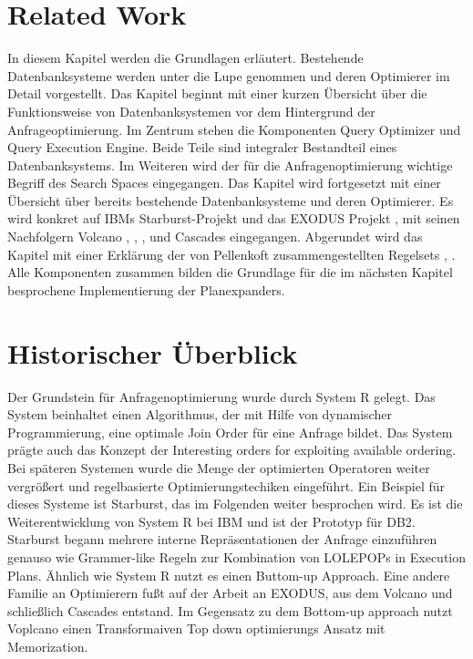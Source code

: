 \section{Related Work}

In diesem Kapitel werden die Grundlagen erläutert. Bestehende Datenbanksysteme werden unter die Lupe genommen und deren Optimierer im Detail vorgestellt. Das Kapitel beginnt mit einer kurzen Übersicht über die Funktionsweise von Datenbanksystemen vor dem Hintergrund der Anfrageoptimierung. Im Zentrum stehen die Komponenten Query Optimizer und Query Execution Engine. Beide Teile sind integraler Bestandteil eines Datenbanksystems. Im Weiteren wird der für die Anfragenoptimierung wichtige Begriff des Search Spaces eingegangen. Das Kapitel wird fortgesetzt mit einer Übersicht über bereits bestehende Datenbanksysteme und deren Optimierer. Es wird konkret auf IBMs Starburst-Projekt und das EXODUS Projekt \cite{graefe1987exodus}, \cite{carey1990exodus} mit seinen Nachfolgern Volcano \cite{graefe1990parallelizing}, \cite{graefe1990encapsulation}, \cite{graefe1993volcano}, \cite{graefe1994volcano} und Cascades \cite{graefe1995cascades} eingegangen. Abgerundet wird das Kapitel mit einer Erklärung der von Pellenkoft zusammengestellten Regelsets \cite{pellenkoft1997complexity}, \cite{pellenkoft1997duplicate}. Alle Komponenten zusammen bilden die Grundlage für die im nächsten Kapitel besprochene Implementierung der Planexpanders.


\section{Historischer Überblick}
Der Grundstein für Anfragenoptimierung wurde durch System R gelegt. Das System beinhaltet einen Algorithmus, der mit Hilfe von dynamischer Programmierung, eine optimale Join Order für eine Anfrage bildet. Das System prägte auch das Konzept der Interesting orders for exploiting available ordering. Bei späteren Systemen  wurde die Menge der optimierten Operatoren weiter vergrößert und regelbasierte Optimierungstechiken eingeführt. Ein Beispiel für dieses Systeme ist Starburst, das im Folgenden weiter besprochen wird. Es ist die Weiterentwicklung von System R bei IBM und ist der Prototyp für DB2. Starburst begann mehrere interne Repräsentationen der Anfrage einzuführen genauso wie Grammer-like Regeln zur Kombination von LOLEPOPs in Execution Plans. Ähnlich wie System R nutzt es einen Buttom-up Approach. Eine andere Familie an Optimierern fußt auf der Arbeit an EXODUS, aus dem Volcano und schließlich Cascades entstand. Im Gegensatz zu dem Bottom-up approach nutzt Voplcano einen Transformaiven Top down optimierungs Ansatz mit Memorization. 

